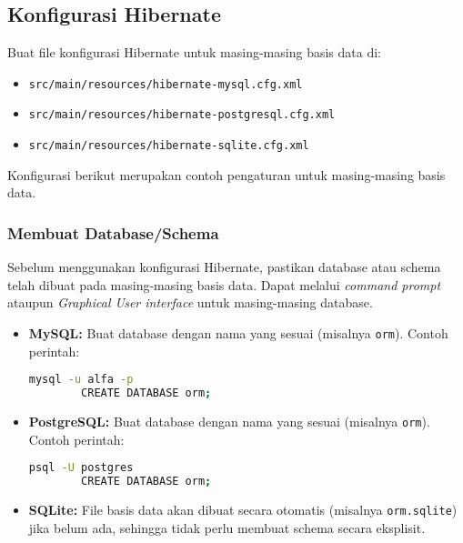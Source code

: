 \subsection{Konfigurasi Hibernate}
Buat file konfigurasi Hibernate untuk masing-masing basis data di:
\begin{itemize}
	\item \texttt{src/main/resources/hibernate-mysql.cfg.xml}
	\item \texttt{src/main/resources/hibernate-postgresql.cfg.xml}
	\item \texttt{src/main/resources/hibernate-sqlite.cfg.xml}
\end{itemize}

Konfigurasi berikut merupakan contoh pengaturan untuk masing-masing basis data.

\subsubsection*{Membuat Database/Schema}
Sebelum menggunakan konfigurasi Hibernate, pastikan database atau schema telah dibuat pada masing-masing basis data.
Dapat melalui \textit{command prompt} ataupun \textit{Graphical User interface} untuk masing-masing database.
\begin{itemize}
	\item \textbf{MySQL:} Buat database dengan nama yang sesuai (misalnya \texttt{orm}). Contoh perintah:
	\begin{lstlisting}[language=bash, style=XmlStyle]
		mysql -u alfa -p
		CREATE DATABASE orm;
	\end{lstlisting}
	\item \textbf{PostgreSQL:} Buat database dengan nama yang sesuai (misalnya \texttt{orm}). Contoh perintah:
	\begin{lstlisting}[language=bash, style=XmlStyle]
		psql -U postgres
		CREATE DATABASE orm;
	\end{lstlisting}
	\item \textbf{SQLite:} File basis data akan dibuat secara otomatis (misalnya \texttt{orm.sqlite}) jika belum ada, sehingga tidak perlu membuat schema secara eksplisit.
\end{itemize}

